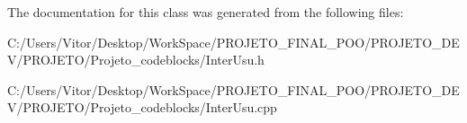 The documentation for this class was generated from the following files\-:\begin{DoxyCompactItemize}
\item 
C\-:/\-Users/\-Vitor/\-Desktop/\-Work\-Space/\-P\-R\-O\-J\-E\-T\-O\-\_\-\-F\-I\-N\-A\-L\-\_\-\-P\-O\-O/\-P\-R\-O\-J\-E\-T\-O\-\_\-\-D\-E\-V/\-P\-R\-O\-J\-E\-T\-O/\-Projeto\-\_\-codeblocks/Inter\-Usu.\-h\item 
C\-:/\-Users/\-Vitor/\-Desktop/\-Work\-Space/\-P\-R\-O\-J\-E\-T\-O\-\_\-\-F\-I\-N\-A\-L\-\_\-\-P\-O\-O/\-P\-R\-O\-J\-E\-T\-O\-\_\-\-D\-E\-V/\-P\-R\-O\-J\-E\-T\-O/\-Projeto\-\_\-codeblocks/Inter\-Usu.\-cpp\end{DoxyCompactItemize}
